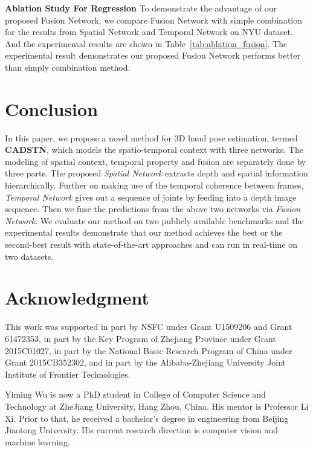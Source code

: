 \documentclass[journal,comsoc]{IEEEtran}
\begin{document}
\textbf{Ablation Study For Regression}
To demonstrate the advantage of our proposed Fusion Network, we compare Fusion Network with simple combination for the results from Spatial Network and Temporal Network on NYU dataset. And the experimental results are shown in Table~\mbox{\ref{tab:ablation_fusion}}. The experimental result demonstrates our proposed Fusion Network performs better than simply combination method.

\section{Conclusion}\label{sec:conclusion}
In this paper, we propose a novel method for 3D hand pose estimation, termed \textbf{CADSTN},
which models the spatio-temporal context with three networks.
The modeling of spatial context, temporal property and fusion
are separately done by three parts.
The proposed \emph{Spatial Network} extracts depth and spatial information
hierarchically. Further on making use of the temporal coherence
between frames, \emph{Temporal Network} gives out a sequence of joints by feeding into a depth
image sequence. Then we fuse the predictions from the above two networks via \emph{Fusion Network}.
We evaluate our method on two publicly available benchmarks and the experimental results demonstrate
that our method achieves the best or the second-best result with state-of-the-art approaches and can run in real-time on two datasets.

\appendices


\section*{Acknowledgment}
This work was supported in part by NSFC under Grant U1509206 and Grant 61472353, in part by the Key Program of Zhejiang Province under Grant 2015C01027, in part by the National Basic Research Program of China under Grant 2015CB352302, and in part by the Alibaba-Zhejiang University Joint Institute of Frontier Technologies.


\ifCLASSOPTIONcaptionsoff
  \newpage
\fi




\ifCLASSOPTIONcaptionsoff
  \newpage
\fi

\begin{IEEEbiography}{Yiming Wu} is now a PhD student in College of Computer Science and Technology at ZheJiang University, Hang Zhou, China. His mentor is Professor Li Xi. Prior to that, he received a bachelor's degree in engineering from Beijing Jiaotong University. His current research direction is computer vision and machine learning.\end{IEEEbiography}
\end{document}
